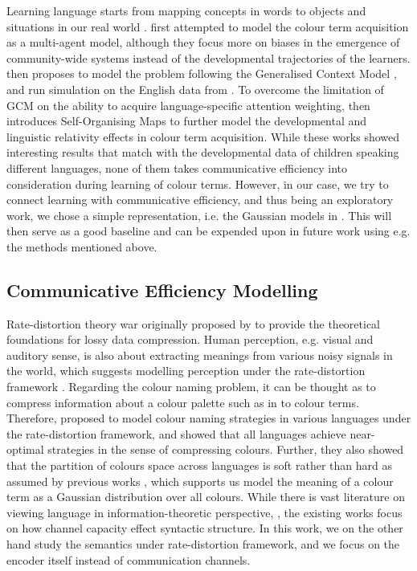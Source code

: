 \documentclass[11pt]{article}
\begin{document}
Learning language starts from mapping concepts in words to objects and situations in our real world \cite{mollica2021logical}.
\citet{bleys2005colourcategory} first attempted to model the colour term acquisition as a multi-agent model, although they focus more on biases in the emergence of community-wide systems instead of the developmental trajectories of the learners.
\citet{beekhuizen2015perceptual} then proposes to model the problem following the Generalised Context Model \citep[GCM;][]{nosofsky1987attention}, and run simulation on the English data from \citet{bateman1915}.
To overcome the limitation of GCM on the ability to acquire language-specific attention weighting, \citet{beekhuizen2016modeling} then introduces Self-Organising Maps \cite{kohonen2001self} to further model the developmental and linguistic relativity effects in colour term acquisition.
While these works showed interesting results that match with the developmental data of children speaking different languages, none of them takes communicative efficiency into consideration during learning of colour terms.
However, in our case, we try to connect learning with communicative efficiency, and thus being an exploratory work, we chose a simple representation, i.e. the Gaussian models in \citet{zaslavsky2018efficient}. 
This will then serve as a good baseline and can be expended upon in future work using e.g. the methods mentioned above.

\subsection{Communicative Efficiency Modelling}
\label{ssec:back_colour_communicate}

Rate-distortion theory war originally proposed by \citet{shannon1959coding} to provide the theoretical foundations for lossy data compression. 
Human perception, e.g. visual and auditory sense, is also about extracting meanings from various noisy signals in the world, which suggests modelling perception under the rate-distortion framework \cite{sims2016rate}.
Regarding the colour naming problem, it can be thought as to compress information about a colour palette such as \cite{berlin1991basic} in to colour terms.
Therefore, \citet{zaslavsky2018efficient} proposed to model colour naming strategies in various languages under the rate-distortion framework, and showed that all languages achieve near-optimal strategies in the sense of compressing colours.
Further, they also showed that the partition of colours space across languages is soft rather than hard as assumed by previous works \citep[e.g.][]{levinson2000basic, maclaury1997color}, which supports us model the meaning of a colour term as a Gaussian distribution over all colours.
While there is vast literature on viewing language in information-theoretic perspective, \citep[e.g.][]{Piantadosi3526, gibson2013wordorder, levy2007speakers, Baddeley2009relation}, the existing works focus on how channel capacity effect syntactic structure.
In this work, we on the other hand study the semantics under rate-distortion framework, and we focus on the encoder itself instead of communication channels.
\end{document}
